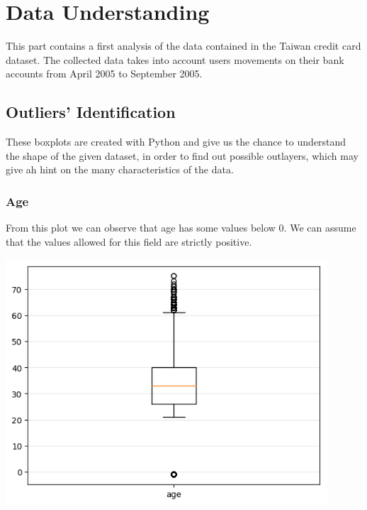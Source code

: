 \documentclass[a4paper]{article}
\begin{document}

\tableofcontents
\newpage




\section{Data Understanding}

This part contains a first analysis of the data contained in the Taiwan credit card dataset. The collected data takes into account users movements on their bank accounts from April 2005 to September 2005.



\subsection{Outliers' Identification}
These boxplots are created with Python and give us the chance to understand the shape of the given dataset, in order to find out possible outlayers, which may give ah hint on the many characteristics of the data.
\subsubsection{Age}
From this plot we can observe that age has some values below $0$. We can assume that the values allowed for this field are strictly positive.
\begin{center}
\includegraphics[width=0.9\textwidth]{../Code/boxPlotsGemma/boxplots/age.png}
\end{center}
\end{document}
